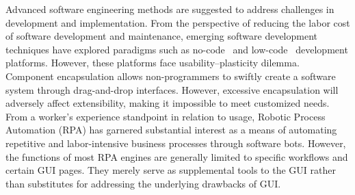 \documentclass[preprint,12pt]{elsarticle}
\begin{document}
Advanced software engineering methods are suggested to address challenges in development and implementation. 
From the perspective of reducing the labor cost of software development and maintenance,
emerging software development techniques have explored paradigms such as no-code~\cite{rokis2022challenges} and low-code~\cite{cabot2020positioning} development platforms.
However, these platforms face usability--plasticity dilemma.
Component encapsulation allows non-programmers to swiftly create a software system through drag-and-drop interfaces.
However, excessive encapsulation will adversely affect extensibility, making it impossible to meet customized needs.
From a worker's experience standpoint in relation to usage, Robotic Process Automation (RPA)\cite{siderska2020robotic} has garnered substantial interest as a means of automating repetitive and labor-intensive business processes through software bots.
However, the functions of most RPA engines are generally limited to specific workflows and certain GUI pages.
They merely serve as supplemental tools to the GUI rather than substitutes for addressing the underlying drawbacks of GUI.
\end{document}
